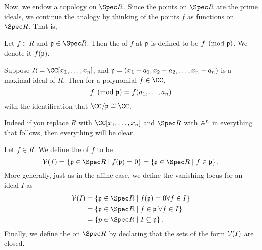 \documentclass[11pt]{scrreprt}
\begin{document}
Now, we endow a topology on $\Spec R$.
Since the points on $\Spec R$ are the prime ideals, we continue
the analogy by thinking of the points $f$ as functions on $\Spec R$. That is,
\begin{definition}
	Let $f \in R$ and $\pp \in \Spec R$.
	Then the  of $f$ at $\mathfrak p$ is defined to be $f \pmod{\mathfrak p}$.
	We denote it $f(\mathfrak p)$.
\end{definition}
\begin{example}
	Suppose $R = \CC[x_1, \dots, x_n]$,
	and $\mathfrak p = (x_1-a_1, x_2-a_2, \dots, x_n-a_n)$ is a maximal ideal of $R$.
	Then for a polynomial $f \in \CC$,
	\[ f \pmod {\mathfrak p} = f(a_1, \dots, a_n) \]
	with the identification that $\CC/\pp \cong \CC$.
\end{example}
Indeed if you replace $R$ with $\CC[x_1, \dots, x_n]$
and $\Spec R$ with $\mathbb A^n$ in everything that follows,
then everything will be clear.

\begin{definition}
	Let $f \in R$. We define the  of $f$ to be
	\[ \VV(f) = \left\{ \pp \in \Spec R \mid f(\pp) = 0 \right\}
		= \left\{ \pp \in \Spec R \mid f \in \pp \right\}. \]
	More generally, just as in the affine case,
	we define the vanishing locus for an ideal $I$ as
	\begin{align*}
		\VV(I) &= \left\{ \pp \in \Spec R \mid f(\pp)=0 \forall f \in I \right\} \\
		&= \left\{ \pp \in \Spec R \mid f \in \pp \; \forall f \in I \right\} \\
		&= \left\{ p \in \Spec R \mid I \subseteq \pp \right\}.
	\end{align*}
	Finally, we define the  on $\Spec R$
	by declaring that the sets of the form $\mathcal V(I)$ are closed.
\end{definition}
\end{document}

